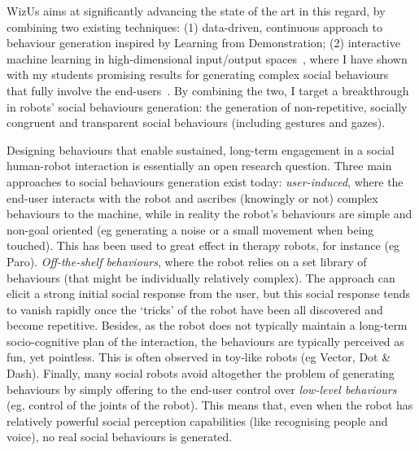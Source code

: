 \documentclass[11pt,a4paper]{report}
\newcommand{\project}{WizUs\xspace}
\begin{document}
\project aims
at significantly advancing the state of the art in this regard, by combining two
existing techniques: (1) data-driven, continuous approach to behaviour
generation inspired by Learning from Demonstration; (2) interactive machine
learning in high-dimensional input/output spaces~\cite{senft2020woz}, where I
have shown with my students promising results for generating complex social
behaviours~\cite{senft2019teaching, winkle2020couch} that fully involve the
end-users~\cite{winkle2018social}.  By combining the two, I target
a breakthrough in robots' social behaviours generation: the generation of
non-repetitive, socially congruent and transparent social behaviours (including
gestures and gazes).

%

Designing behaviours that
enable sustained, long-term engagement in a social human-robot interaction is
essentially an open research question. Three main approaches to social
behaviours generation exist today: \emph{user-induced}, where the end-user
interacts with the robot and ascribes (knowingly or not) complex behaviours to
the machine, while in reality the robot's behaviours are simple and non-goal
oriented (eg generating a noise or a small movement when being touched). This
has been used to great effect in therapy robots, for instance (eg Paro).
\emph{Off-the-shelf behaviours}, where the robot relies on a set library of
behaviours (that might be individually relatively complex). The approach can
elicit a strong initial social response from the user, but this social response
tends to vanish rapidly once the `tricks' of the robot have been all discovered
and become repetitive.  Besides, as the robot does not typically maintain a
long-term socio-cognitive plan of the interaction, the behaviours are typically
perceived as fun, yet pointless. This is often observed in toy-like robots (eg
Vector, Dot \& Dash). Finally, many social robots avoid altogether the problem
of generating behaviours by simply offering to the end-user control over
\emph{low-level behaviours} (eg, control of the joints of the robot). This means
that, even when the robot has relatively powerful social perception capabilities
(like recognising people and voice), no real social behaviours is generated.
\end{document}
